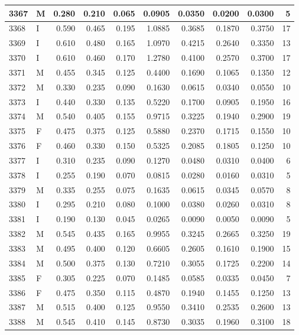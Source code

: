 \documentclass[9pt,twocolumn,twoside,]{pnas-new}
\begin{document}
\begin{tabular}{l|l|r|r|r|r|r|r|r|r}
\hline
3367 & M & 0.280 & 0.210 & 0.065 & 0.0905 & 0.0350 & 0.0200 & 0.0300 & 5\\
\hline
3368 & I & 0.590 & 0.465 & 0.195 & 1.0885 & 0.3685 & 0.1870 & 0.3750 & 17\\
\hline
3369 & I & 0.610 & 0.480 & 0.165 & 1.0970 & 0.4215 & 0.2640 & 0.3350 & 13\\
\hline
3370 & I & 0.610 & 0.460 & 0.170 & 1.2780 & 0.4100 & 0.2570 & 0.3700 & 17\\
\hline
3371 & M & 0.455 & 0.345 & 0.125 & 0.4400 & 0.1690 & 0.1065 & 0.1350 & 12\\
\hline
3372 & M & 0.330 & 0.235 & 0.090 & 0.1630 & 0.0615 & 0.0340 & 0.0550 & 10\\
\hline
3373 & I & 0.440 & 0.330 & 0.135 & 0.5220 & 0.1700 & 0.0905 & 0.1950 & 16\\
\hline
3374 & M & 0.540 & 0.405 & 0.155 & 0.9715 & 0.3225 & 0.1940 & 0.2900 & 19\\
\hline
3375 & F & 0.475 & 0.375 & 0.125 & 0.5880 & 0.2370 & 0.1715 & 0.1550 & 10\\
\hline
3376 & F & 0.460 & 0.330 & 0.150 & 0.5325 & 0.2085 & 0.1805 & 0.1250 & 10\\
\hline
3377 & I & 0.310 & 0.235 & 0.090 & 0.1270 & 0.0480 & 0.0310 & 0.0400 & 6\\
\hline
3378 & I & 0.255 & 0.190 & 0.070 & 0.0815 & 0.0280 & 0.0160 & 0.0310 & 5\\
\hline
3379 & M & 0.335 & 0.255 & 0.075 & 0.1635 & 0.0615 & 0.0345 & 0.0570 & 8\\
\hline
3380 & I & 0.295 & 0.210 & 0.080 & 0.1000 & 0.0380 & 0.0260 & 0.0310 & 8\\
\hline
3381 & I & 0.190 & 0.130 & 0.045 & 0.0265 & 0.0090 & 0.0050 & 0.0090 & 5\\
\hline
3382 & M & 0.545 & 0.435 & 0.165 & 0.9955 & 0.3245 & 0.2665 & 0.3250 & 19\\
\hline
3383 & M & 0.495 & 0.400 & 0.120 & 0.6605 & 0.2605 & 0.1610 & 0.1900 & 15\\
\hline
3384 & M & 0.500 & 0.375 & 0.130 & 0.7210 & 0.3055 & 0.1725 & 0.2200 & 14\\
\hline
3385 & F & 0.305 & 0.225 & 0.070 & 0.1485 & 0.0585 & 0.0335 & 0.0450 & 7\\
\hline
3386 & F & 0.475 & 0.350 & 0.115 & 0.4870 & 0.1940 & 0.1455 & 0.1250 & 13\\
\hline
3387 & M & 0.515 & 0.400 & 0.125 & 0.9550 & 0.3410 & 0.2535 & 0.2600 & 13\\
\hline
3388 & M & 0.545 & 0.410 & 0.145 & 0.8730 & 0.3035 & 0.1960 & 0.3100 & 18\\

\end{tabular}
\end{document}
